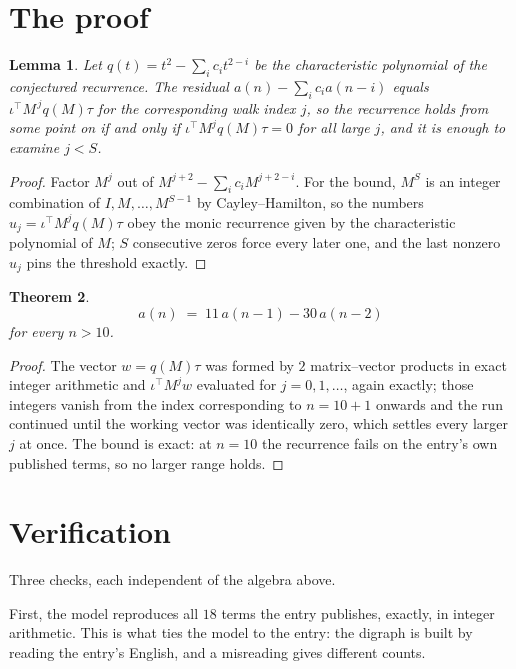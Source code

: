 \documentclass[11pt,a4paper]{article}
\theoremstyle{plain}
\newtheorem{theorem}{Theorem}
\newtheorem{lemma}[theorem]{Lemma}
\theoremstyle{definition}
\begin{document}
\section{The proof}

\begin{lemma}\label{lem:crit}
Let $q(t)=t^{2}-\sum_i c_it^{2-i}$ be the characteristic polynomial of the
conjectured recurrence. The residual $a(n)-\sum_ic_ia(n-i)$ equals
$\iota^{\!\top}M^{\,j}q(M)\tau$ for the corresponding walk index $j$, so the recurrence
holds from some point on if and only if $\iota^{\!\top}M^{j}q(M)\tau=0$ for all large $j$,
and it is enough to examine $j<S$.
\end{lemma}

\begin{proof}
Factor $M^{j}$ out of $M^{j+2}-\sum_ic_iM^{j+2-i}$. For the bound, $M^{S}$
is an integer combination of $I,M,\dots,M^{S-1}$ by Cayley--Hamilton, so the numbers
$u_j=\iota^{\!\top}M^{j}q(M)\tau$ obey the monic recurrence given by the characteristic
polynomial of $M$; $S$ consecutive zeros force every later one, and the last nonzero $u_j$
pins the threshold exactly.
\end{proof}

\begin{theorem}
\[
a(n)\;=\;11\,a(n-1) - 30\,a(n-2)
\]
for every $n>10$.
\end{theorem}

\begin{proof}
The vector $w=q(M)\tau$ was formed by $2$ matrix--vector products in exact integer
arithmetic and $\iota^{\!\top}M^{j}w$ evaluated for $j=0,1,\dots$, again exactly; those
integers vanish from the index corresponding to $n=10+1$ onwards and the run continued
until the working vector was identically zero, which settles every larger $j$ at once. The bound is exact: at $n=10$ the recurrence fails on the entry's own published terms, so no larger range holds.
\end{proof}

\section{Verification}

Three checks, each independent of the algebra above.

First, the model reproduces all $18$ terms the entry publishes, exactly, in integer
arithmetic. This is what ties the model to the entry: the digraph is built by reading the
entry's English, and a misreading gives different counts.
\end{document}
